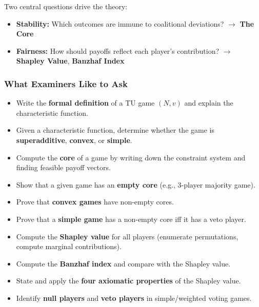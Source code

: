 Two central questions drive the theory:
\begin{itemize}
  \item \textbf{Stability:} Which outcomes are immune to coalitional deviations? $\to$ \textbf{The Core}
  \item \textbf{Fairness:} How should payoffs reflect each player's contribution? $\to$ \textbf{Shapley Value}, \textbf{Banzhaf Index}
\end{itemize}

\separator

\subsubsection*{What Examiners Like to Ask}

\begin{itemize}
  \item Write the \textbf{formal definition} of a TU game $(N, v)$ and explain the characteristic function.
  \item Given a characteristic function, determine whether the game is \textbf{superadditive}, \textbf{convex}, or \textbf{simple}.
  \item Compute the \textbf{core} of a game by writing down the constraint system and finding feasible payoff vectors.
  \item Show that a given game has an \textbf{empty core} (e.g., 3-player majority game).
  \item Prove that \textbf{convex games} have non-empty cores.
  \item Prove that a \textbf{simple game} has a non-empty core iff it has a veto player.
  \item Compute the \textbf{Shapley value} for all players (enumerate permutations, compute marginal contributions).
  \item Compute the \textbf{Banzhaf index} and compare with the Shapley value.
  \item State and apply the \textbf{four axiomatic properties} of the Shapley value.
  \item Identify \textbf{null players} and \textbf{veto players} in simple/weighted voting games.
\end{itemize}

\separator

